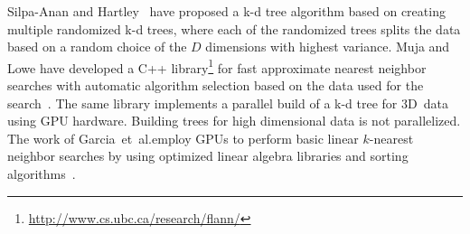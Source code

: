 


   Silpa-Anan and Hartley~\cite{silpa2008a} have proposed 
  a k-d tree algorithm based on creating multiple randomized k-d trees, where 
  each of the randomized trees splits the data based on a random choice of the 
  $D$ dimensions with highest variance.  Muja and Lowe have developed a C++ 
  library\footnote{\url{http://www.cs.ubc.ca/research/flann/}} for fast 
  approximate nearest neighbor searches with automatic algorithm selection 
  based on the data used for the search~\cite{muja2009a,muja2014a}.  The same 
  library implements a parallel build of a k-d tree for $3$D~data using GPU 
  hardware.  Building trees for high dimensional data is not parallelized.  The 
  work of Garcia~et~al.\@ employ GPUs to perform basic linear $k$-nearest 
  neighbor searches by using optimized linear algebra libraries and sorting 
  algorithms~\cite{garcia2008a,garcia2010a}.


